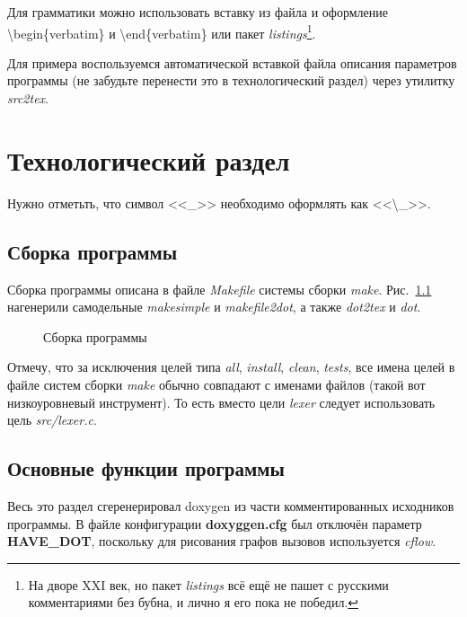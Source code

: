\documentclass[a4paper,12pt]{report}
\begin{document}
Для грамматики можно использовать вставку из файла и оформление \textbackslash{}begin\{verbatim\} и \textbackslash{}end\{verbatim\} или пакет \textit{listings}\footnote{На дворе XXI век, но пакет \textit{listings} всё ещё не пашет с русскими комментариями без бубна, и лично я его пока не победил.}.

Для примера воспользуемся автоматической вставкой файла описания параметров программы (не забудьте перенести это в технологический раздел) через утилитку \textit{src2tex}.

% 
% 

\chapter{Технологический раздел}

Нужно отметьть, что символ <<\_>> необходимо оформлять как <<\textbackslash\_>>.

\section{Сборка программы}

Сборка программы описана в файле \textit{Makefile} системы сборки \textit{make}. Рис.~\ref{fig:make} нагенерили самодельные \textit{makesimple} и \textit{makefile2dot}, а также \textit{dot2tex} и \textit{dot}.

\begin{figure}
\centering
\caption{Сборка программы}
\label{fig:make}
\end{figure}

Отмечу, что за исключения целей типа \textit{all}, \textit{install}, \textit{clean}, \textit{tests}, все имена целей в файле систем сборки \textit{make} обычно совпадают с именами файлов (такой вот низкоуровневый инструмент). То есть вместо цели \textit{lexer} следует использовать цель \textit{src/lexer.c}.

\section{Основные функции программы}

Весь это раздел сгеренерировал doxygen из части комментированных исходников программы. В файле конфигурации \textbf{doxyggen.cfg} был отключён параметр \textbf{HAVE\_DOT}, поскольку для рисования графов вызовов используется \textit{cflow}.
\end{document}
